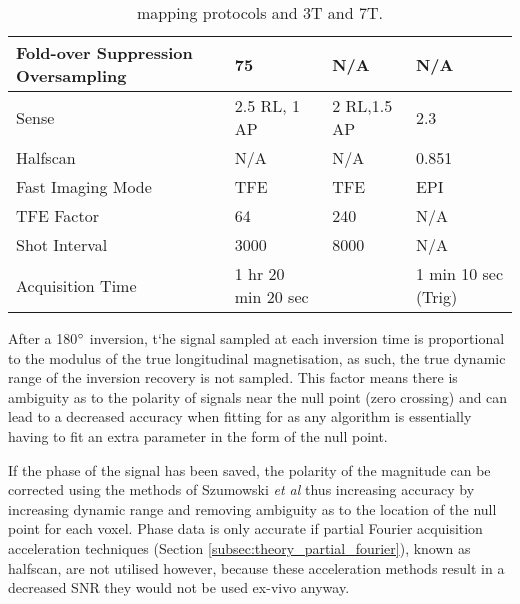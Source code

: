 \begin{table}[H]
\begin{tabularx}{1.0\textwidth}{|X|X|X|X|}
		Fold-over Suppression   Oversampling & 75                                                 & N/A                                                & N/A                                                                \\ \hline
		Sense                                & 2.5 RL, 1 AP                                       & 2 RL,1.5 AP                                        & 2.3                                                                \\ \hline
		Halfscan                             & N/A                                                & N/A                                                & 0.851                                                              \\ \hline
		Fast Imaging Mode                    & TFE                                                & TFE                                                & EPI                                                                \\ \hline
		TFE Factor                           & 64                                                 & 240                                                & N/A                                                                \\ \hline
		Shot Interval                        & 3000                                               & 8000                                               & N/A                                                                \\ \hline
		Acquisition Time                     & 1 hr 20 min 20 sec                                 &                                                    & 1 min 10 sec (Trig)                                                \\ \hline
	\end{tabularx}
	\caption{\tone mapping protocols and 3T and 7T.}
	\label{tab:ex_t1_mapping}
\end{table}

After a 180$\degree$ inversion, t`he signal sampled at each inversion time is proportional to the modulus of the true longitudinal magnetisation, as such, the true dynamic range of the inversion recovery is not sampled. This factor means there is ambiguity as to the polarity of signals near the null point (zero crossing) and can lead to a decreased accuracy when fitting for \tone as any algorithm is essentially having to fit an extra parameter in the form of the null point. 

If the phase of the signal has been saved, the polarity of the magnitude can be corrected using the methods of Szumowski \textit{et al} \cite{szumowski_signal_2012} thus increasing accuracy by increasing dynamic range and removing ambiguity as to the location of the null point for each voxel. Phase data is only accurate if partial Fourier acquisition acceleration techniques (Section \ref{subsec:theory_partial_fourier}), known as halfscan, are not utilised however, because these acceleration methods result in a decreased \ac{SNR} they would not be used ex-vivo anyway.

